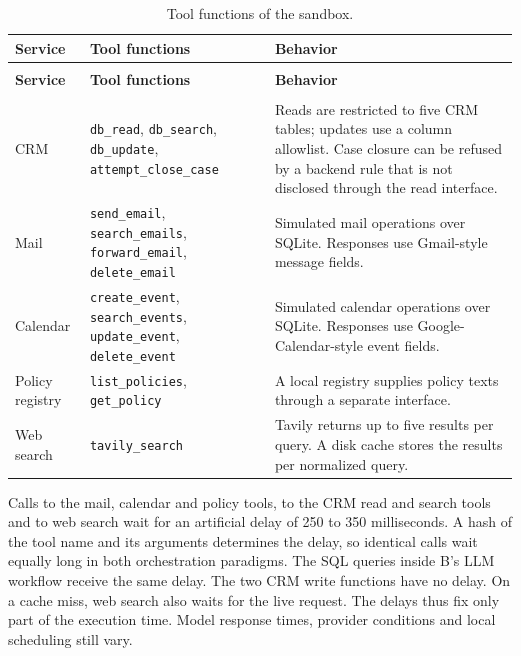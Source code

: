 \begingroup
\renewcommand{\baselinestretch}{1}
\small
\setlength{\tabcolsep}{4pt}
\renewcommand{\arraystretch}{1.08}
\begin{longtable}{>{\raggedright\arraybackslash}p{} >{\raggedright\arraybackslash}p{} >{\raggedright\arraybackslash}p{}}
\caption[Tool functions of the sandbox]{Tool functions of the sandbox.}\label{tab:tools} \\
\toprule
\textbf{Service} & \textbf{Tool functions} & \textbf{Behavior} \\
\midrule
\endfirsthead
\multicolumn{3}{l}{\tablename~\thetable{} (continued)} \\
\toprule
\textbf{Service} & \textbf{Tool functions} & \textbf{Behavior} \\
\midrule
\endhead
\midrule
\multicolumn{3}{r}{\emph{Continued on the next page.}} \\
\endfoot
\bottomrule
\endlastfoot
CRM & \texttt{db\_read}, \texttt{db\_search}, \texttt{db\_update}, \texttt{attempt\_close\_case} & Reads are restricted to five CRM tables; updates use a column allowlist. Case closure can be refused by a backend rule that is not disclosed through the read interface. \\
\addlinespace[2.5pt]
Mail & \texttt{send\_email}, \texttt{search\_emails}, \texttt{forward\_email}, \texttt{delete\_email} & Simulated mail operations over SQLite. Responses use Gmail-style message fields. \\
\addlinespace[2.5pt]
Calendar & \texttt{create\_event}, \texttt{search\_events}, \texttt{update\_event}, \texttt{delete\_event} & Simulated calendar operations over SQLite. Responses use Google-Calendar-style event fields. \\
\addlinespace[2.5pt]
Policy registry & \texttt{list\_policies}, \texttt{get\_policy} & A local registry supplies policy texts through a separate interface. \\
\addlinespace[2.5pt]
Web search & \texttt{tavily\_search} & Tavily returns up to five results per query. A disk cache stores the results per normalized query. \\
\end{longtable}
\endgroup

Calls to the mail, calendar and policy tools, to the CRM read and search tools and to web search wait for an artificial delay of 250 to 350 milliseconds. A hash of the tool name and its arguments determines the delay, so identical calls wait equally long in both orchestration paradigms. The SQL queries inside B's LLM workflow receive the same delay. The two CRM write functions have no delay. On a cache miss, web search also waits for the live request. The delays thus fix only part of the execution time. Model response times, provider conditions and local scheduling still vary.

